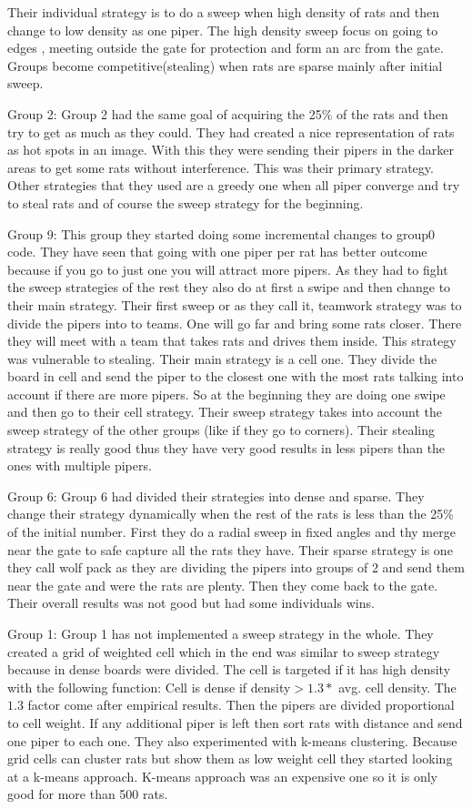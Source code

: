 Their individual strategy is to do a sweep when high density of rats and then 
change to low density as one piper. The high density sweep focus on going to edges
, meeting outside the gate for protection and form an arc from the gate.
Groups become competitive(stealing) when rats are sparse mainly after initial 
sweep.

Group 2:
Group 2 had the same goal of acquiring the 25\% of the rats and then try to get
as much as they could. They had created a nice representation of rats as hot 
spots in an image. With this they were sending their pipers in the darker areas
to get some rats without interference. This was their primary strategy. Other 
strategies that they used are a greedy one when all piper converge and try to
steal rats and of course the sweep strategy for the beginning.

Group 9:
This group they started doing some incremental changes to group0 code. They have
seen that going with one piper per rat has better outcome because if you go to
just one you will attract more pipers. As they had to fight the sweep strategies
of the rest they also do at first a swipe and then change to their main strategy.
Their first sweep or as they call it, teamwork strategy was to divide the pipers
into to teams. One will go far and bring some rats closer. There they will meet 
with a team that takes rats and drives them inside. This strategy was vulnerable
to stealing. 
Their main strategy is a cell one. They divide the board in cell and send the 
piper to the closest one with the most rats talking into account if there are more
pipers. So at the beginning they are doing one swipe and then go to their cell 
strategy. Their sweep strategy takes into account the sweep strategy of the other
groups (like if they go to corners). Their stealing strategy is really good thus
they have very good results in less pipers than the ones with multiple pipers.

Group 6:
Group 6 had divided their strategies into dense and sparse. They change their
strategy dynamically when the rest of the rats is less than the 25\% of the 
initial number. First they do a radial sweep in fixed angles and thy merge near
the gate to safe capture all the rats they have. Their sparse strategy is one
they call wolf pack as they are dividing the pipers into groups of 2 and send 
them near the gate and were the rats are plenty. Then they come back to the gate.
Their overall results was not good but had some individuals wins.

Group 1:
Group 1 has not implemented a sweep strategy in the whole. They created a grid
of weighted cell which in the end was similar to sweep strategy because in dense
boards were divided. The cell is targeted if it has high density with the 
following function: Cell is dense if density$> 1.3*$ avg. cell density.
The $1.3$ factor come after empirical results. Then the pipers are divided 
proportional to cell weight. If any additional piper is left then sort rats with
distance and send one piper to each one. They also experimented with k-means 
clustering. Because grid cells can cluster rats but show them as low weight cell
they started looking at a k-means approach. K-means approach was an expensive 
one so it is only good for more than 500 rats.

